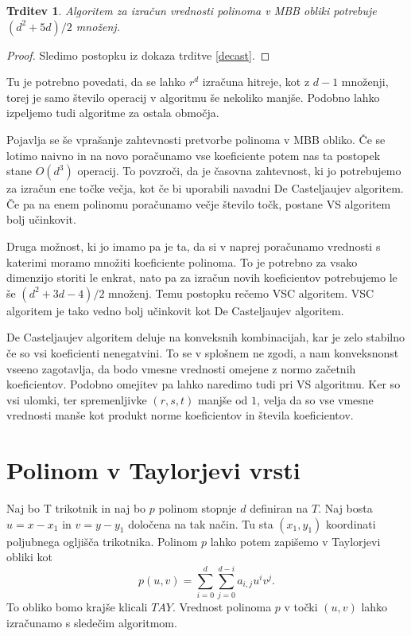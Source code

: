 \documentclass{article}
\newtheorem{trditev}{Trditev}[section]
\begin{document}
\begin{trditev}
Algoritem za izračun vrednosti polinoma v MBB obliki potrebuje $(d^2+5d)/2$ množenj.
\end{trditev}
\begin{proof}
Sledimo postopku iz dokaza trditve \ref{decast}.
\end{proof}
Tu je potrebno povedati, da se lahko $r^d$ izračuna hitreje, kot z $d-1$ množenji, torej je samo število operacij v algoritmu še nekoliko manjše. Podobno lahko izpeljemo tudi algoritme za ostala območja.


\vspace{3mm}

Pojavlja se še vprašanje zahtevnosti pretvorbe polinoma v MBB obliko. Če se lotimo naivno in na novo poračunamo vse koeficiente potem nas ta postopek stane $O(d^3)$ operacij. To povzroči, da je časovna zahtevnost, ki jo potrebujemo za izračun ene točke večja, kot če bi uporabili navadni De Casteljaujev algoritem. Če pa na enem polinomu poračunamo večje število točk, postane VS algoritem bolj učinkovit.

Druga možnost, ki jo imamo pa je ta, da si v naprej poračunamo vrednosti s katerimi moramo množiti koeficiente polinoma. To je potrebno za vsako dimenzijo storiti le enkrat, nato pa za izračun novih koeficientov potrebujemo le še $(d^2+3d-4)/2$ množenj. Temu postopku rečemo VSC algoritem. VSC algoritem je tako vedno bolj učinkovit kot De Casteljaujev algoritem.

De Casteljaujev algoritem deluje na konveksnih kombinacijah, kar je zelo stabilno če so vsi koeficienti nenegatvini. To se v splošnem ne zgodi, a nam konveksnonst vseeno zagotavlja, da bodo vmesne vrednosti omejene z normo začetnih koeficientov. Podobno omejitev pa lahko naredimo tudi pri VS algoritmu. Ker so vsi ulomki, ter spremenljivke $(r,s,t)$ manjše od $1$, velja da so vse vmesne vrednosti manše kot produkt norme koeficientov in števila koeficientov.


\section{Polinom v Taylorjevi vrsti}

Naj bo T trikotnik in naj bo $p$ polinom stopnje $d$ definiran na $T$. Naj bosta $u = x-x_1$ in $v = y-y_1$ določena na tak način. Tu sta $(x_1,y_1)$ koordinati poljubnega ogljišča trikotnika. Polinom $p$ lahko potem zapišemo v Taylorjevi obliki kot 
$$p(u,v) = \sum_{i = 0}^d{\sum_{j=0}^{d-i}{a_{i,j}u^iv^j }}.$$To obliko bomo krajše klicali $TAY$.  Vrednost polinoma $p$ v točki $(u,v)$ lahko izračunamo s sledečim algoritmom.
\end{document}
